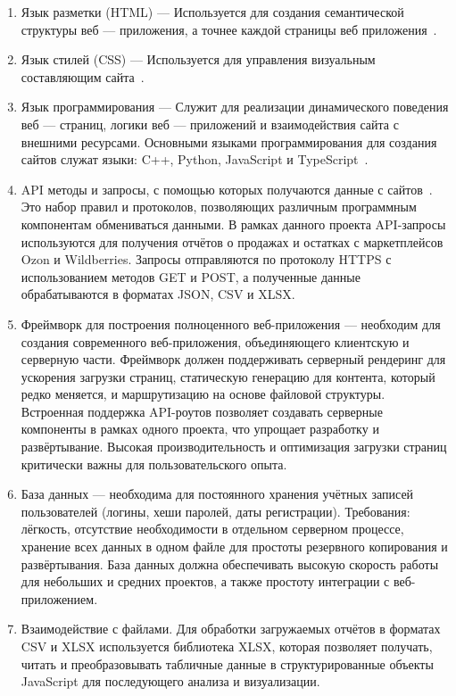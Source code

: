 \begin{enumerate}
     \item Язык разметки (HTML) — Используется для создания семантической структуры веб — приложения, а точнее каждой страницы веб приложения~\cite{webProgramming}.
     \item Язык стилей (CSS) — Используется для управления визуальным составляющим сайта~\cite{webProgramming}.
     \item Язык программирования — Служит для реализации динамического поведения веб — страниц, логики веб — приложений и взаимодействия сайта с внешними ресурсами. Основными языками программирования для создания сайтов служат языки: C++, Python, JavaScript и TypeScript~\cite{webProgramming}.
     \item API методы и запросы, с помощью которых получаются данные с сайтов~\cite{usingAPI1}. Это набор правил и протоколов, позволяющих различным программным компонентам обмениваться данными. В рамках данного проекта API-запросы используются для получения отчётов о продажах и остатках с маркетплейсов Ozon и Wildberries. Запросы отправляются по протоколу HTTPS с использованием методов GET и POST, а полученные данные обрабатываются в форматах JSON, CSV и XLSX.
     \item Фреймворк для построения полноценного веб-приложения — необходим для создания современного веб-приложения, объединяющего клиентскую и серверную части. Фреймворк должен поддерживать серверный рендеринг для ускорения загрузки страниц, статическую генерацию для контента, который редко меняется, и маршрутизацию на основе файловой структуры. Встроенная поддержка API-роутов позволяет создавать серверные компоненты в рамках одного проекта, что упрощает разработку и развёртывание. Высокая производительность и оптимизация загрузки страниц критически важны для пользовательского опыта.
     \item База данных — необходима для постоянного хранения учётных записей пользователей (логины, хеши паролей, даты регистрации). Требования: лёгкость, отсутствие необходимости в отдельном серверном процессе, хранение всех данных в одном файле для простоты резервного копирования и развёртывания. База данных должна обеспечивать высокую скорость работы для небольших и средних проектов, а также простоту интеграции с веб-приложением.
     \item Взаимодействие с файлами. Для обработки загружаемых отчётов в форматах CSV и XLSX используется библиотека XLSX, которая позволяет получать, читать и преобразовывать табличные данные в структурированные объекты JavaScript для последующего анализа и визуализации.
\end{enumerate}


